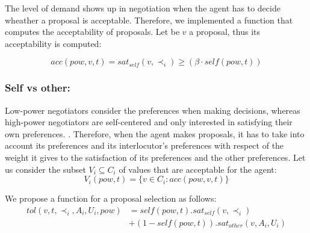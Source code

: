 \documentclass[runningheads,a4paper]{llncs}
\begin{document}
	
			
	The level of demand shows up in negotiation when the agent has to decide wheather a proposal is acceptable.
	Therefore, we implemented a function that computes the acceptability of proposals. Let be $v$ a proposal, thus its acceptability is computed:

	\begin{equation}
	acc(pow,v, t) = sat_{self}(v, \prec_i) \geq  (\beta \cdot self(pow,t))
	\end{equation}
	
	
	\subsubsection{Self vs other:} Low-power negotiators consider the preferences when making decisions, whereas high-power negotiators are self-centered and only interested in satisfying their own preferences. \cite{fiske1993controlling,de1995impact}.
	Therefore, when the agent makes proposals, it has to take into account its preferences and its interlocutor's preferences with respect of the weight it gives to the satisfaction of its preferences and the other preferences.	
	Let us consider the subset $V_i\subseteq C_i$ of values that are acceptable for the agent:
	\begin{equation}
	V_i(pow,t) = \{ v\in C_i : acc(pow,v,t) \}
	\end{equation}
	
	We propose a function for a proposal selection as follows:
	\begin{equation}
	\begin{split}
	tol(v, t, \prec_i, A_i, U_i, pow) & = self(pow, t) . sat_{self}(v, \prec_i) \\
	& +  (1 - self(pow, t)) . sat_{other}(v, A_i, U_i)
	\end{split}
	\end{equation}
	
\end{document}
